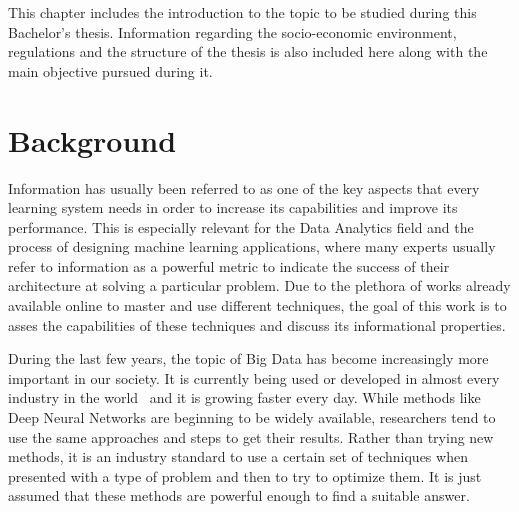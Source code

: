 This chapter includes the introduction to the topic to be studied during this Bachelor's thesis. Information regarding the socio-economic environment, regulations and the structure of the thesis is also included here along with the main objective pursued during it.

\section{Background}
Information has usually been referred to as one of the key aspects that every learning system needs in order to increase its capabilities and improve its performance. This is especially relevant for the Data Analytics field and the process of designing machine learning applications, where many experts usually refer to information as a powerful metric to indicate the success of their architecture at solving a particular problem. Due to the plethora of works already available online to master and use different techniques, the goal of this work is to asses the capabilities of these techniques and discuss its informational properties. 


During the last few years, the topic of Big Data has become increasingly more important in our society. It is currently being used or developed in almost every industry in the world~\cite{article_Big_Data} and it is growing faster every day. While methods like Deep Neural Networks are beginning to be  widely available,  researchers tend to use the same approaches and steps to get their results. Rather than trying new methods, it is an industry standard to use a certain set of techniques when presented with a type of problem and then to try to optimize them. It is just assumed that these methods are powerful enough to find a suitable answer. 


